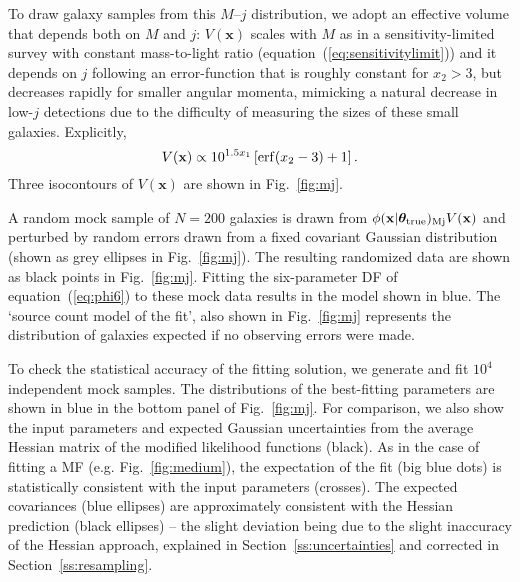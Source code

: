 \documentclass[a4paper,fleqn,usenatbib]{mnras}
\newcommand{\be}{\begin{equation}}
\newcommand{\ee}{\end{equation}}
\newcommand{\veff}{V}%
\newcommand{\x}{\mathbf{x}}
\newcommand{\fig}[1]{Fig.~\ref{fig:#1}}
\newcommand{\eq}[1]{equation~(\ref{eq:#1})}
\renewcommand{\ss}[1]{Section~\ref{ss:#1}}
\newcommand{\eg}{e.g.\xspace}
\newcommand{\para}{{\bm{\theta}}}
\begin{document}
To draw galaxy samples from this $M$--$j$ distribution, we adopt an effective volume that depends both on $M$ and $j$: $\veff(\x)$ scales with $M$ as in a sensitivity-limited survey with constant mass-to-light ratio (\eq{sensitivitylimit}) and it depends on $j$ following an error-function that is roughly constant for $x_2>3$, but decreases rapidly for smaller angular momenta, mimicking a natural decrease in low-$j$ detections due to the difficulty of measuring the sizes of these small galaxies. Explicitly,
%
\be\label{eq:veffmj}
	\veff(\x)\propto 10^{1.5x_1}\left[{\rm erf}(x_2-3)+1\right].
\ee
%
Three isocontours of $\veff(\x)$ are shown in \fig{mj}.

A random mock sample of $N=200$ galaxies is drawn from $\phi(\x|\para_{\rm true})_{\rm Mj}\veff(\x)$ and perturbed by random errors drawn from a fixed covariant Gaussian distribution (shown as grey ellipses in \fig{mj}). The resulting randomized data are shown as black points in \fig{mj}. Fitting the six-parameter DF of \eq{phi6} to these mock data results in the model shown in blue. The `source count model of the fit', also shown in \fig{mj} represents the distribution of galaxies expected if no observing errors were made.

To check the statistical accuracy of the fitting solution, we generate and fit $10^4$ independent mock samples. The distributions of the best-fitting parameters are shown in blue in the bottom panel of \fig{mj}. For comparison, we also show the input parameters and expected Gaussian uncertainties from the average Hessian matrix of the modified likelihood functions (black). As in the case of fitting a MF (\eg \fig{medium}), the expectation of the fit (big blue dots) is statistically consistent with the input parameters (crosses). The expected covariances (blue ellipses) are approximately consistent with the Hessian prediction (black ellipses) -- the slight deviation being due to the slight inaccuracy of the Hessian approach, explained in \ss{uncertainties} and corrected in \ss{resampling}.
\end{document}
